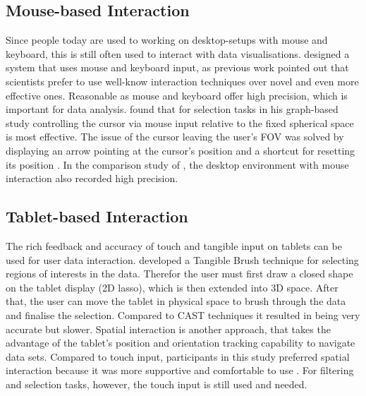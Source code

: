 \subsection{Mouse-based Interaction}
\label{subsection:Desktop-based Interaction}
Since people today are used to working on desktop-setups with mouse and keyboard, this is still often used to interact with data visualisations. 
 \cite{Wang2020} designed a system that uses mouse and keyboard input, as previous work pointed out that scientists prefer to use well-know interaction techniques over novel and even more effective ones. Reasonable as mouse and keyboard offer high precision, which is important for data analysis. 
 \newline \cite{Kwon2016} found that for selection tasks in his graph-based study controlling the cursor via mouse input relative to the fixed spherical space is most effective. The issue of the cursor leaving the user's \ac{FOV} was solved by displaying an arrow pointing at the cursor's position and a shortcut for resetting its position \autocite[]{Kwon2016}.
In the comparison study of \cite{Bach2018}, the desktop environment with mouse interaction also recorded high precision.

\subsection{Tablet-based Interaction}
\label{subsection:Tablet-based Interaction}
The rich feedback and accuracy of touch and tangible input on tablets can be used for user data interaction. \cite{Besancon2019} developed a Tangible Brush technique for selecting regions of interests in the data. Therefor the user must first draw a closed shape on the tablet display (2D lasso), which is then extended into 3D space. After that, the user can move the tablet in physical space to brush through the data and finalise the selection. Compared to CAST techniques \autocite{Yu2016} it resulted in being very accurate but slower.\newline
Spatial interaction is another approach, that takes the advantage of the tablet's position and orientation tracking capability to navigate data sets. Compared to touch input, participants in this study preferred spatial interaction because it was more supportive and comfortable to use \autocite{Buschel2017}. For filtering and selection tasks, however, the touch input is still used and needed.

